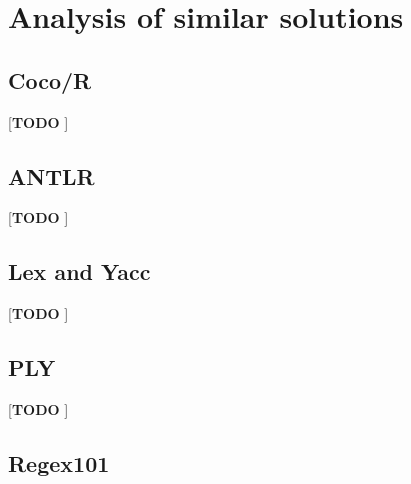 \documentclass[english,engineering]{wizthesis}
\newcommand{\todo}[1]{{\color{red}[\textbf{TODO} \textit{#1}]}}
\begin{document}



\chapter{Analysis of similar solutions}

\section{Coco/R}

\todo{\cite{coco/r}}

\section{ANTLR}

\todo{\cite{antlr}}

\section{Lex and Yacc}

\todo{\cite{lex-yacc}}

\section{PLY}

\todo{\cite{ply}}

\section{Regex101}
\end{document}
